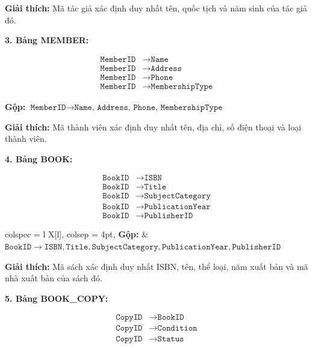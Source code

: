 \documentclass[12pt,a4paper]{article}
\begin{document}
\textbf{Giải thích:} Mã tác giả xác định duy nhất tên, quốc tịch và năm sinh của tác giả đó.

\vspace{0.5cm}

\textbf{3. Bảng MEMBER:}

$$
\begin{aligned}
\texttt{MemberID} &\rightarrow \texttt{Name} \\
\texttt{MemberID} &\rightarrow \texttt{Address} \\
\texttt{MemberID} &\rightarrow \texttt{Phone} \\
\texttt{MemberID} &\rightarrow \texttt{MembershipType}
\end{aligned}
$$

\textbf{Gộp:} $\texttt{MemberID} \rightarrow \texttt{Name, Address, Phone, MembershipType}$

\textbf{Giải thích:} Mã thành viên xác định duy nhất tên, địa chỉ, số điện thoại và loại thành viên.

\vspace{0.5cm}

\textbf{4. Bảng BOOK:}

$$
\begin{aligned}
\texttt{BookID} &\rightarrow \texttt{ISBN} \\
\texttt{BookID} &\rightarrow \texttt{Title} \\
\texttt{BookID} &\rightarrow \texttt{SubjectCategory} \\
\texttt{BookID} &\rightarrow \texttt{PublicationYear} \\
\texttt{BookID} &\rightarrow \texttt{PublisherID}
\end{aligned}
$$


\begin{tblr}{
  colspec = {l X[l]}, %
  colsep = 4pt,       %
}
\textbf{Gộp:} & $\texttt{BookID} \rightarrow \texttt{ISBN}, \texttt{Title}, \texttt{SubjectCategory}, \texttt{PublicationYear}, \texttt{PublisherID}$ \\
\end{tblr}


\textbf{Giải thích:} Mã sách xác định duy nhất ISBN, tên, thể loại, năm xuất bản và mã nhà xuất bản của sách đó.

\vspace{0.5cm}

\textbf{5. Bảng BOOK\_COPY:}

$$
\begin{aligned}
\texttt{CopyID} &\rightarrow \texttt{BookID} \\
\texttt{CopyID} &\rightarrow \texttt{Condition} \\
\texttt{CopyID} &\rightarrow \texttt{Status}
\end{aligned}
$$
\end{document}
